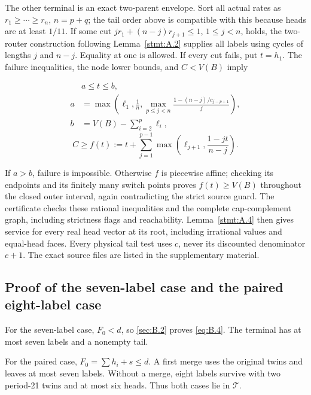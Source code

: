 \documentclass[11pt,a4paper]{article}
\begin{document}
The other terminal is an exact two-parent envelope. Sort all actual rates as \(r_1\ge\cdots\ge r_n\), \(n=p+q\); the tail order above is compatible with this because heads are at least \(1/11\). If some cut \(j r_1+(n-j)r_{j+1}\le1\), \(1\le j<n\), holds, the two-router construction following Lemma~\ref{stmt:A.2} supplies all labels using cycles of lengths \(j\) and \(n-j\). Equality at one is allowed. If every cut fails, put \(t=h_1\). The failure inequalities, the node lower bounds, and \(C<V(B)\) imply

\begin{equation}
\begin{aligned}
 &a\le t\le b,\quad\\
 a&=\max\!\left(\ell_1,\frac1n,
       \max_{p\le j<n}\frac{1-(n-j)/c_{j-p+1}}j\right),
 \\
 b&=V(B)-\sum_{i=2}^p\ell_i,
\end{aligned}
\tag{B.10}\label{eq:B.10}
\end{equation} \begin{equation}
C\ge f(t):=
 t+\sum_{j=1}^{p-1}
 \max\!\left(\ell_{j+1},\frac{1-jt}{n-j}\right).
\tag{B.11}\label{eq:B.11}
\end{equation}

If \(a>b\), failure is impossible. Otherwise \(f\) is piecewise affine; checking its endpoints and its finitely many switch points proves \(f(t)\ge V(B)\) throughout the closed outer interval, again contradicting the strict source guard. The certificate checks these rational inequalities and the complete cap-complement graph, including strictness flags and reachability. Lemma~\ref{stmt:A.4} then gives service for every real head vector at its root, including irrational values and equal-head faces. Every physical tail test uses \(c\), never its discounted denominator \(c+1\). The exact source files are listed in the supplementary material.

\subsection{Proof of the seven-label case and the paired eight-label case}\label{sec:B.4}

For the seven-label case, \(F_0<d\), so \ref{sec:B.2} proves \eqref{eq:B.4}. The terminal has at most seven labels and a nonempty tail.

For the paired case, \(F_0=\sum h_i+s\le d\). A first merge uses the original twins and leaves at most seven labels. Without a merge, eight labels survive with two period-21 twins and at most six heads. Thus both cases lie in \(\mathcal T\).
\end{document}
